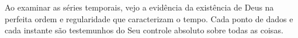 \vspace*{\fill}

\begin{dedicatoria}
	Ao examinar as séries temporais, vejo a evidência da existência de Deus na perfeita ordem e regularidade que caracterizam o tempo. Cada ponto de dados e cada instante são testemunhos do Seu controle absoluto sobre todas as coisas.
\end{dedicatoria}
